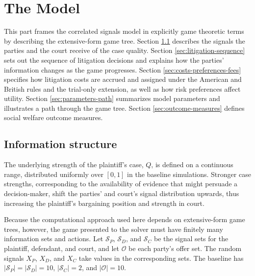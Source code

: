 \documentclass{article}
\begin{document}
\section{The Model}
\label{sec:model}

This part frames the correlated signals model in explicitly game theoretic terms by describing the extensive-form game tree. Section \ref{sec:information-structure} describes the signals the parties and the court receive of the case quality. Section \ref{sec:litigation-sequence} sets out the sequence of litigation decisions and explains how the parties' information changes as the game progresses. Section \ref{sec:costs-preferences-fees} specifies how litigation costs are accrued and assigned under the American and British rules and the trial-only extension, as well as how risk preferences affect utility. Section \ref{sec:parameters-path} summarizes model parameters and illustrates a path through the game tree. Section \ref{sec:outcome-measures} defines social welfare outcome measures.

\subsection{Information structure}
\label{sec:information-structure}

The underlying strength of the plaintiff's case, $Q$, is defined on a continuous range, distributed uniformly over $[0,1]$ in the baseline simulations. Stronger case strengths, corresponding to the availability of evidence that might persuade a decision-maker, shift the parties' and court's signal distribution upwards, thus increasing the plaintiff's bargaining position and strength in court. 

Because the computational approach used here depends on extensive-form game trees, however, the game presented to the solver must have finitely many information sets and actions. Let $\mathcal{S}_P$, $\mathcal{S}_D$, and $\mathcal{S}_C$ be the signal sets for the plaintiff, defendant, and court, and let $\mathcal{O}$ be each party's offer set. The random signals $X_P$, $X_D$, and $X_C$ take values in the corresponding sets. The baseline has $|\mathcal{S}_P|=|\mathcal{S}_D|=10$, $|\mathcal{S}_C|=2$, and $|\mathcal{O}|=10$. 
\end{document}
